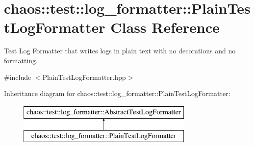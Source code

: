 \hypertarget{classchaos_1_1test_1_1log__formatter_1_1_plain_test_log_formatter}{}\section{chaos\+:\+:test\+:\+:log\+\_\+formatter\+:\+:Plain\+Test\+Log\+Formatter Class Reference}
\label{classchaos_1_1test_1_1log__formatter_1_1_plain_test_log_formatter}


Test Log Formatter that writes logs in plain text with no decorations and no formatting.  




{\ttfamily \#include $<$Plain\+Test\+Log\+Formatter.\+hpp$>$}

Inheritance diagram for chaos\+:\+:test\+:\+:log\+\_\+formatter\+:\+:Plain\+Test\+Log\+Formatter\+:\begin{figure}[H]
\begin{center}
\leavevmode
\includegraphics[height=2.000000cm]{classchaos_1_1test_1_1log__formatter_1_1_plain_test_log_formatter}
\end{center}
\end{figure}
